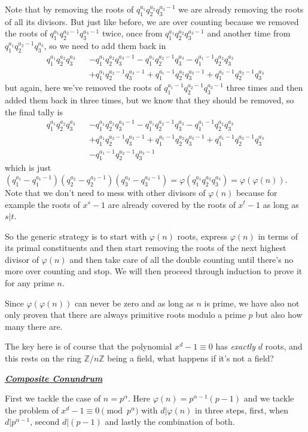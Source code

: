 \documentclass[aps,preprint,preprintnumbers,nofootinbib,showpacs,prd]{revtex4-1}
\newcommand{\nbea}{\begin{eqnarray*}}
\newcommand{\neea}{\end{eqnarray*}}
\begin{document}
Note that by removing the roots of $q_1^{a_1}q_2^{a_2}q_3^{a_3-1}$ we are already removing the roots of all its divisors. But just like before, we are over counting because we removed the roots of $q_1^{a_1}q_2^{a_2-1}q_3^{a_3-1}$ twice, once from $q_1^{a_1}q_2^{a_2}q_3^{a_3-1}$ and another time from $q_1^{a_1}q_2^{a_2-1}q_3^{a_3}$, so we need to add them back in
%
\nbea
q_1^{a_1}q_2^{a_2}q_3^{a_3} &&  - q_1^{a_1}q_2^{a_2}q_3^{a_3-1} - q_1^{a_1}q_2^{a_2-1}q_3^{a_3}- q_1^{a_1-1}q_2^{a_2}q_3^{a_3} \\
&& + q_1^{a_1}q_2^{a_2-1}q_3^{a_3-1} + q_1^{a_1-1}q_2^{a_2}q_3^{a_3-1} + q_1^{a_1-1}q_2^{a_2-1}q_3^{a_3}
\neea
%
but again, here we've removed the roots of $q_1^{a_1-1}q_2^{a_2-1}q_3^{a_3-1}$ three times and then added them back in three times, but we know that they should be removed, so the final tally is
%
\nbea
q_1^{a_1}q_2^{a_2}q_3^{a_3} &&  - q_1^{a_1}q_2^{a_2}q_3^{a_3-1} - q_1^{a_1}q_2^{a_2-1}q_3^{a_3}- q_1^{a_1-1}q_2^{a_2}q_3^{a_3} \\
&& + q_1^{a_1}q_2^{a_2-1}q_3^{a_3-1} + q_1^{a_1-1}q_2^{a_2}q_3^{a_3-1} + q_1^{a_1-1}q_2^{a_2-1}q_3^{a_3} \\
&& -q_1^{a_1-1}q_2^{a_2-1}q_3^{a_3-1}
\neea
%
which is just $(q_1^{a_1} - q_1^{a_1-1})(q_2^{a_2}-q_2^{a_2-1})(q_3^{a_3} - q_3^{a_3-1}) =\varphi(q_1^{a_1}q_2^{a_2}q_3^{a_3}) = \varphi(\varphi(n))$. Note that we don't need to mess with other divisors of $\varphi(n)$ because for example the roots of $x^s - 1$ are already covered by the roots of $x^t - 1$ as long as $s|t$.

So the generic strategy is to start with $\varphi(n)$ roots, express $\varphi(n)$ in terms of its primal constituents and then start removing the roots of the next highest divisor of $\varphi(n)$ and then take care of all the double counting until there's no more over counting and stop. We will then proceed through induction to prove it for any prime $n$.

Since $\varphi(\varphi(n))$ can never be zero and as long as $n$ is prime, we have also not only proven that there are always primitive roots modulo a prime $p$ but also how many there are.

The key here is of course that the polynomial $x^d - 1 \equiv 0$ has {\it exactly} $d$ roots, and this rests on the ring $\mathbb{Z}/n\mathbb{Z}$ being a field, what happens if it's not a field?

\bigskip
\underline{\textit{\textbf{Composite Conundrum}}}
\bigskip

First we tackle the case of $n = p^\alpha$. Here $\varphi(n) = p^{\alpha-1}(p-1)$ and we tackle the problem of $x^d - 1\equiv 0 \pmod{p^\alpha}$ with $d|\varphi(n)$ in three steps, first, when $d|p^{\alpha-1}$, second $d|(p-1)$ and lastly the combination of both.
\end{document}
